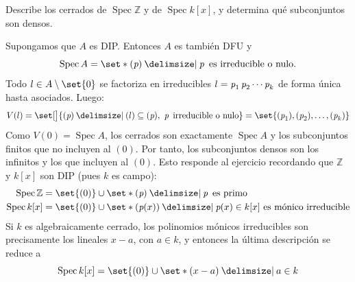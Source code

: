 \begin{ejer}
Describe los cerrados de $\operatorname{Spec}\mathbb{Z}$ y de $\operatorname{Spec}k[x]$, y determina qué subconjuntos son densos.
\end{ejer}
\begin{sol}
Supongamos que $A$ es DIP. Entonces $A$ es también DFU y
\[
\operatorname{Spec}A=\set*{(\p)\given \p\text{ es irreducible o nulo}}.
\]
Todo $l\in A\setminus\set{0}$ se factoriza en irreducibles $l=\operatorname{\textit{p}}_1\operatorname{\textit{p}}_2\cdots \operatorname{\textit{p}}_k$ de forma única hasta asociados. Luego:
\[
V(l)=\set[\big]{(\p)\given (l)\subseteq(\p),\ \p\text{ irreducible o nulo}}
=\set{(\p_1),(\p_2),\ldots,(\p_k)}
\]
Como $V(0)=\operatorname{Spec}A$, los cerrados son exactamente $\operatorname{Spec}A$ y los subconjuntos finitos que no incluyen al $(0)$. Por tanto, los subconjuntos densos son los infinitos y los que incluyen al $(0)$. Esto responde al ejercicio recordando que $\mathbb{Z}$ y $k[x]$ son DIP (pues $k$ es campo):
\[
\begin{aligned}
\operatorname{Spec}\mathbb{Z} &= \set{(0)}\cup\set*{(\p)\given \p\text{ es primo}}\\
\operatorname{Spec}k[x] &= \set{(0)}\cup
\set*{(\p(x))\given \p(x)\in k[x]\text{ es mónico irreducible}}
\end{aligned}
\]
Si $k$ es algebraicamente cerrado, los polinomios mónicos irreducibles son
precisamente los lineales $x-a$, con $a\in k$, y entonces la última descripción se
reduce a 
\[
\operatorname{Spec}k[x]=\set{(0)}\cup\set*{(x-a)\given a\in k}
\]
\end{sol}
